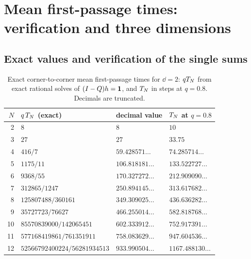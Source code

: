 \section{Mean first-passage times: verification and three dimensions}\label{sup_mfpt:sec}

\subsection{Exact values and verification of the single sums}\label{appA_proofs:ssec-verif}

\begin{table}[htb]
\centering\small
\caption{Exact corner-to-corner mean first-passage times for $\dd=2$: $qT_{N}$ from exact rational solves of
$(I-Q)h=\mathbf{1}$, and $T_{N}$ in steps at $q=0.8$. Decimals are truncated.}\label{s4_mfpt:tab-exact}
\begin{tabular}{@{}rlll@{}}
\toprule
$N$ & $q\,T_{N}$ (exact) & decimal value & $T_{N}$ at $q=0.8$\\
\midrule
2  & $8$ & $8$ & $10$\\
3  & $27$ & $27$ & $33.75$\\
4  & $416/7$ & $59.428571\ldots$ & $74.285714\ldots$\\
5  & $1175/11$ & $106.818181\ldots$ & $133.522727\ldots$\\
6  & $9368/55$ & $170.327272\ldots$ & $212.909090\ldots$\\
7  & $312865/1247$ & $250.894145\ldots$ & $313.617682\ldots$\\
8  & $125807488/360161$ & $349.309025\ldots$ & $436.636282\ldots$\\
9  & $35727723/76627$ & $466.255014\ldots$ & $582.818768\ldots$\\
10 & $85570839000/142065451$ & $602.333912\ldots$ & $752.917391\ldots$\\
11 & $577168419861/761351911$ & $758.083629\ldots$ & $947.604536\ldots$\\
12 & $52566792400224/56281934513$ & $933.990504\ldots$ & $1167.488130\ldots$\\
\bottomrule
\end{tabular}
\end{table}

